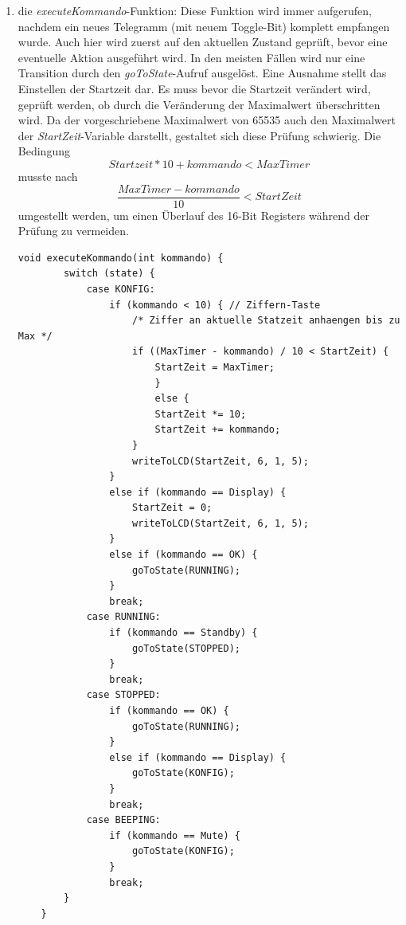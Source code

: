 \documentclass[12pt,a4paper,bibliography=totocnumbered,listof=totocnumbered]{scrartcl}
\begin{document}
\begin{enumerate}
	\vspace{1em}
	\begin{lstlisting}[caption=ISR von TimerB]
	char blinkToggle = 0;
	char anzahlPieps = 0;
	// wird jedesmal aufgerufen, wenn Interrupt von TimerB kommt
	#pragma vector=TIMERB0_VECTOR
	__interrupt void Timer_B0(void)	{
		switch (state) {
			case KONFIG:
				// ohne Funktion
				break;
			case RUNNING:
				// muss im Sekundentakt runterzaehlen
				vergangeneZeit++;
				if (StartZeit - vergangeneZeit == 0) {
					goToState(BEEPING);
				}
				writeToLCD(StartZeit - vergangeneZeit, 6, 1, 5);
				break;
			case STOPPED:
				// timer steht - Restanzeige muss blinken
				if (blinkToggle == 1) {
					writeToLCD(StartZeit - vergangeneZeit, 6, 1, 5);
				}
				else {
					lcd_gotoxy(6, 1);
					lcd_puts("-----");
				}
				blinkToggle ^= 1;
				break;
			case BEEPING:
				piepen(2); // Doppel-Piepen
				anzahlPieps++;
				if (anzahlPieps == MaxPieps) {
					goToState(KONFIG);
				}
				break;
	}
	\end{lstlisting}
	
	\item die \textit{executeKommando}-Funktion: \newline
	Diese Funktion wird immer aufgerufen, nachdem ein neues Telegramm (mit neuem Toggle-Bit) komplett empfangen wurde. Auch hier wird zuerst auf den aktuellen Zustand geprüft, bevor eine eventuelle Aktion ausgeführt wird. In den meisten Fällen wird nur eine Transition durch den \textit{goToState}-Aufruf ausgelöst. Eine Ausnahme stellt das Einstellen der Startzeit dar. Es muss bevor die Startzeit verändert wird, geprüft werden, ob durch die Veränderung der Maximalwert überschritten wird. Da der vorgeschriebene Maximalwert von 65535 auch den Maximalwert der \textit{StartZeit}-Variable darstellt, gestaltet sich diese Prüfung schwierig. Die Bedingung \[Startzeit*10+kommando < MaxTimer\] musste nach \[\frac{MaxTimer-kommando}{10}<StartZeit\] umgestellt werden, um einen Überlauf des 16-Bit Registers während der Prüfung zu vermeiden.
	
	\vspace{1em}
	\begin{lstlisting}[caption=die executeKommando-Funktion]
	void executeKommando(int kommando) {
		switch (state) {
			case KONFIG:
				if (kommando < 10) { // Ziffern-Taste
					/* Ziffer an aktuelle Statzeit anhaengen bis zu Max */
					if ((MaxTimer - kommando) / 10 < StartZeit) {
						StartZeit = MaxTimer;
						}
						else {
						StartZeit *= 10;
						StartZeit += kommando;
					}
					writeToLCD(StartZeit, 6, 1, 5);
				}
				else if (kommando == Display) {
					StartZeit = 0;
					writeToLCD(StartZeit, 6, 1, 5);
				}
				else if (kommando == OK) {
					goToState(RUNNING);					
				}
				break;
			case RUNNING:
				if (kommando == Standby) {
					goToState(STOPPED);
				}
				break;
			case STOPPED:
				if (kommando == OK) {
					goToState(RUNNING);
				}
				else if (kommando == Display) {
					goToState(KONFIG);
				}
				break;
			case BEEPING:
				if (kommando == Mute) {
					goToState(KONFIG);
				}
				break;
		}
	}
	\end{lstlisting}
	
	
\end{enumerate}
\end{document}
